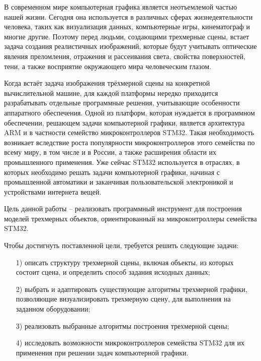 \Introduction


В современном мире компьютерная графика является неотъемлемой частью нашей жизни. Сегодня она используется в различных сферах 
жизнедеятельности человека, таких как визуализация данных, компьютерные игры, кинематограф и многие другие. Поэтому перед людьми, 
создающими трехмерные сцены, встает задача создания реалистичных изображений, которые будут учитывать оптические явления преломления, 
отражения и рассеивания света, свойства поверхностей, тени, а также восприятие окружающего мира человеческим глазом.

Когда встаёт задача изображения трёхмерной сцены на конкретной вычислительной машине, для каждой платформы нередко приходится разрабатывать 
отдельные программные решения, учитывающие особенности аппаратного обеспечения. Одной из платформ, которая нуждается в программном 
обеспечении, решающем задачи компьютерной графики, является архитектура ARM и в частности семейство микроконтроллеров STM32. Такая 
необходимость возникает вследствие роста популярности микроконтроллеров этого семейства по всему миру, в том числе и в России, а также 
расширения области их промышленного применения. Уже сейчас STM32 используется в отраслях, в которых необходимо решать задачи компьютерной 
графики, начиная с промышленной автоматики и заканчивая пользовательской электроникой и устройствами интернета вещей.

Цель данной работы – реализовать программный инструмент для построения моделей трехмерных объектов, ориентированный на микроконтроллеры 
семейства STM32.

Чтобы достигнуть поставленной цели, требуется решить следующие задачи:
\begin{enumerate}
	\item[1)] описать структуру трехмерной сцены, включая объекты, из которых состоит сцена, и определить способ задания исходных данных;
	\item[2)] выбрать и адаптировать существующие алгоритмы трехмерной графики, позволяющие визуализировать трехмерную сцену, для выполнения на заданном оборудовании;
	\item[3)] реализовать выбранные алгоритмы построения трехмерной сцены;
	\item[4)] исследовать возможности микроконтроллеров семейства STM32 для их применения при решении задач компьютерной графики. 
\end{enumerate}

